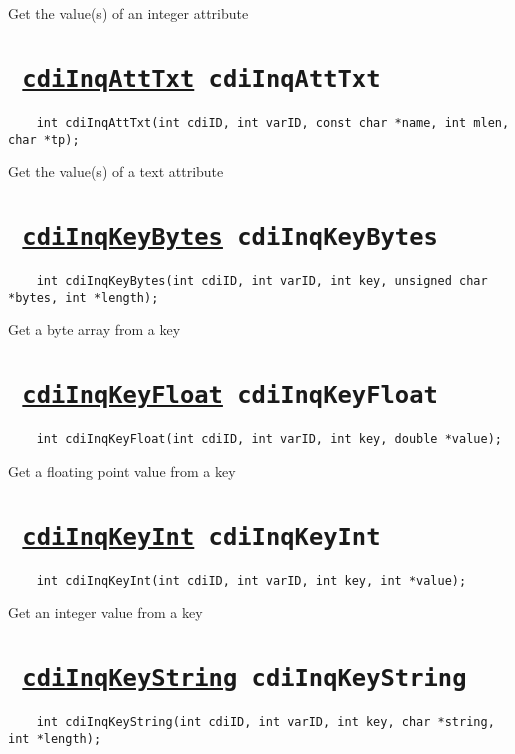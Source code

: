 Get the value(s) of an integer attribute
\ifpdfoutput{}{(\ref{cdiInqAttInt})}


\section*{\texttt{ 
\ifpdf
\hyperref[cdiInqAttTxt]{cdiInqAttTxt}
\else
cdiInqAttTxt
\fi
}}
\begin{verbatim}
    int cdiInqAttTxt(int cdiID, int varID, const char *name, int mlen, char *tp);
\end{verbatim}

Get the value(s) of a text attribute
\ifpdfoutput{}{(\ref{cdiInqAttTxt})}


\section*{\texttt{ 
\ifpdf
\hyperref[cdiInqKeyBytes]{cdiInqKeyBytes}
\else
cdiInqKeyBytes
\fi
}}
\begin{verbatim}
    int cdiInqKeyBytes(int cdiID, int varID, int key, unsigned char *bytes, int *length);
\end{verbatim}

Get a byte array from a key
\ifpdfoutput{}{(\ref{cdiInqKeyBytes})}


\section*{\texttt{ 
\ifpdf
\hyperref[cdiInqKeyFloat]{cdiInqKeyFloat}
\else
cdiInqKeyFloat
\fi
}}
\begin{verbatim}
    int cdiInqKeyFloat(int cdiID, int varID, int key, double *value);
\end{verbatim}

Get a floating point value from a key
\ifpdfoutput{}{(\ref{cdiInqKeyFloat})}


\section*{\texttt{ 
\ifpdf
\hyperref[cdiInqKeyInt]{cdiInqKeyInt}
\else
cdiInqKeyInt
\fi
}}
\begin{verbatim}
    int cdiInqKeyInt(int cdiID, int varID, int key, int *value);
\end{verbatim}

Get an integer value from a key
\ifpdfoutput{}{(\ref{cdiInqKeyInt})}


\section*{\texttt{ 
\ifpdf
\hyperref[cdiInqKeyString]{cdiInqKeyString}
\else
cdiInqKeyString
\fi
}}
\begin{verbatim}
    int cdiInqKeyString(int cdiID, int varID, int key, char *string, int *length);
\end{verbatim}

